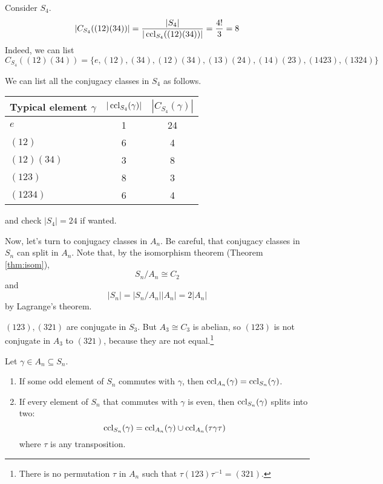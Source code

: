 \documentclass[10pt, a4paper, twoside]{report}
\begin{document}
\begin{example} Consider \(S_4\).
    \[|C_{S_4}((12)(34))|=\frac{|S_4|}{|\operatorname{ccl}_{S_4}((12)(34))|}=\frac{4!}{3}=8\]
    Indeed, we can list 
    \[C_{S_4}((12)(34))=\{e,(12),(34),(12)(34),(13)(24),(14)(23),(1423),(1324)\}\]
\end{example}
\begin{example}
    We can list all the conjugacy classes in \(S_4\) as follows.
    \begin{table}[H]
        \centering
        \begin{tabularx}{0.6\textwidth}{Xcc}
            \toprule
            Typical element \(\gamma\) & \(|\operatorname{ccl}_{S_4}(\gamma)|\) & \(|C_{S_4}(\gamma)|\) \\
            \midrule
            \(e\) & 1 & 24 \\
            \((12)\) & 6 & 4 \\
            \((12)(34)\) & 3 & 8 \\
            \((123)\) & 8 & 3 \\
            \((1234)\) & 6 & 4 \\
            \bottomrule 
        \end{tabularx}
    \end{table}
    and check \(|S_4|=24\) if wanted.
    \label{eg:conj_s4}
\end{example}
Now, let's turn to conjugacy classes in \(A_n\). Be careful, that conjugacy classes in \(S_n\) can split in \(A_n\). Note that, by the isomorphism theorem (Theorem \ref{thm:isom}), 
\[S_n/A_n\cong C_2\]
and 
\[|S_n|=|S_n/A_n||A_n|=2|A_n|\]
by Lagrange's theorem.
\begin{example}
    \((123),(321)\) are conjugate in \(S_3\). But \(A_3\cong C_3\) is abelian, so \((123)\) is not conjugate in \(A_3\) to \((321)\), because they are not equal.\footnote{There is no permutation \(\tau\) in \(A_n\) such that \(\tau(123)\tau^{-1}=(321)\).}
\end{example}
\begin{lemma}
    Let \(\gamma\in A_n\subseteq S_n\).
    \begin{enumerate}
        \item If some odd element of \(S_n\) commutes with \(\gamma\), then \(\operatorname{ccl}_{A_n}(\gamma)=\operatorname{ccl}_{S_n}(\gamma)\).
        \item If every element of \(S_n\) that commutes with \(\gamma\) is even, then \(\operatorname{ccl}_{S_n}(\gamma)\) splits into two:
        \[\operatorname{ccl}_{S_n}(\gamma)=\operatorname{ccl}_{A_n}(\gamma)\cup\operatorname{ccl}_{A_n}(\tau\gamma\tau)\]
        where \(\tau\) is any transposition.
    \end{enumerate}
\end{lemma}
\end{document}
